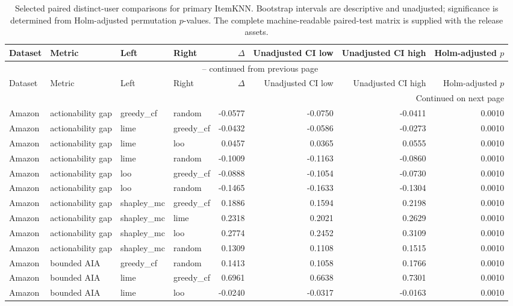 \begin{longtable}{@{}p{}p{}p{}p{}rrrr@{}}
\caption{Selected paired distinct-user comparisons for primary ItemKNN. Bootstrap intervals are descriptive and unadjusted; significance is determined from Holm-adjusted permutation $p$-values. The complete machine-readable paired-test matrix is supplied with the release assets.}\label{tab:S3}\\
\toprule
Dataset & Metric & Left & Right & $\Delta$ & Unadjusted CI low & Unadjusted CI high & Holm-adjusted $p$ \\
\midrule
\endfirsthead
\multicolumn{8}{c}{\tablename\ \thetable{} -- continued from previous page}\\
\toprule
Dataset & Metric & Left & Right & $\Delta$ & Unadjusted CI low & Unadjusted CI high & Holm-adjusted $p$ \\
\midrule
\endhead
\midrule
\multicolumn{8}{r}{Continued on next page}\\
\endfoot
\bottomrule
\endlastfoot
Amazon & actionability gap & greedy\_cf & random & -0.0577 & -0.0750 & -0.0411 & 0.0010 \\
Amazon & actionability gap & lime & greedy\_cf & -0.0432 & -0.0586 & -0.0273 & 0.0010 \\
Amazon & actionability gap & lime & loo & 0.0457 & 0.0365 & 0.0555 & 0.0010 \\
Amazon & actionability gap & lime & random & -0.1009 & -0.1163 & -0.0860 & 0.0010 \\
Amazon & actionability gap & loo & greedy\_cf & -0.0888 & -0.1054 & -0.0730 & 0.0010 \\
Amazon & actionability gap & loo & random & -0.1465 & -0.1633 & -0.1304 & 0.0010 \\
Amazon & actionability gap & shapley\_mc & greedy\_cf & 0.1886 & 0.1594 & 0.2198 & 0.0010 \\
Amazon & actionability gap & shapley\_mc & lime & 0.2318 & 0.2021 & 0.2629 & 0.0010 \\
Amazon & actionability gap & shapley\_mc & loo & 0.2774 & 0.2452 & 0.3109 & 0.0010 \\
Amazon & actionability gap & shapley\_mc & random & 0.1309 & 0.1108 & 0.1515 & 0.0010 \\
Amazon & bounded AIA & greedy\_cf & random & 0.1413 & 0.1058 & 0.1766 & 0.0010 \\
Amazon & bounded AIA & lime & greedy\_cf & 0.6961 & 0.6638 & 0.7301 & 0.0010 \\
Amazon & bounded AIA & lime & loo & -0.0240 & -0.0317 & -0.0163 & 0.0010 \\

\end{longtable}
